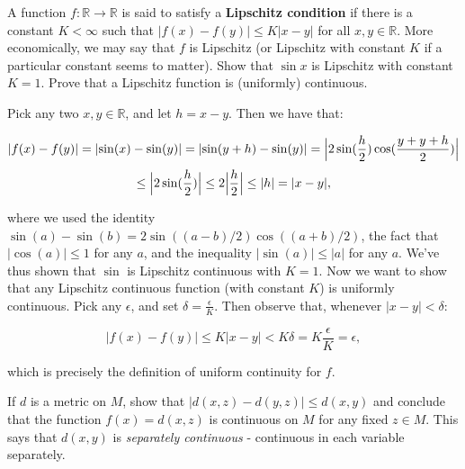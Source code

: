 \begin{exercise}{19}
    A function $f: \mathbb{R} \rightarrow \mathbb{R}$ is said to satisfy a \textbf{Lipschitz condition} if there is a constant $K< \infty$ such that $\lvert f(x) - f(y) \rvert \leq K \lvert x - y \rvert$ for all $x, y \in \mathbb{R}$.
    More economically, we may say that $f$ is Lipschitz (or Lipschitz with constant $K$ if a particular constant seems to matter).
    Show that $\sin x$ is Lipschitz with constant $K = 1$.
    Prove that a Lipschitz function is (uniformly) continuous.
\end{exercise}

\begin{solution}
    
    Pick any two $x, y \in \mathbb{R}$, and let $h = x - y$.
    Then we have that:

    \[\lvert f(x) - f(y) \rvert = \lvert \sin(x) - \sin(y) \rvert = \lvert \sin(y + h) - \sin(y) \rvert = \Bigl\lvert 2 \sin(\frac{h}{2})\cos(\frac{y + y + h}{2}) \Bigr\rvert\]
    \[\leq \Bigl\lvert 2\sin(\frac{h}{2}) \Bigr\rvert \leq 2 \Bigl\lvert \frac{h}{2} \Bigr\rvert \leq \lvert h \rvert = \lvert x - y \rvert,\]

    where we used the identity $\sin(a) - \sin(b) = 2\sin((a - b)/2)\cos((a + b)/2)$, the fact that $\lvert \cos(a) \rvert \leq 1$ for any $a$, and the inequality $\lvert \sin(a) \rvert \leq \lvert a \rvert$ for any $a$.
    We've thus shown that $\sin$ is Lipschitz continuous with $K = 1$.
    Now we want to show that any Lipschitz continuous function (with constant $K$) is uniformly continuous.
    Pick any $\epsilon$, and set $\delta = \frac{\epsilon}{K}$.
    Then observe that, whenever $\lvert x - y \rvert < \delta$:

    \[\lvert f(x) - f(y) \rvert \leq K \lvert x - y \rvert < K \delta = K \frac{\epsilon}{K} = \epsilon,\]

    which is precisely the definition of uniform continuity for $f$.
\end{solution}

\begin{exercise}{20}
    If $d$ is a metric on $M$, show that $\lvert d(x, z) - d(y, z) \rvert \leq d(x, y)$ and conclude that the function $f(x) = d(x, z)$ is continuous on $M$ for any fixed $z \in M$.
    This says that $d(x, y)$ is \textit{separately continuous} - continuous in each variable separately.
\end{exercise}


